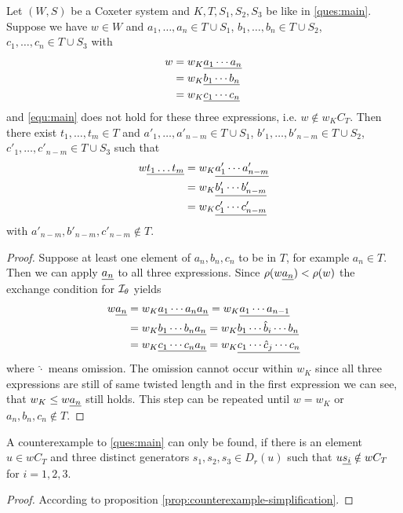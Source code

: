 \begin{prop}
\label{prop:counterexample-simplification}
Let $(W,S)$ be a Coxeter system and $K,T,S_1,S_2,S_3$ be like in \ref{ques:main}.
Suppose we have $w \in W$ and $a_1,\ldots,a_n \in T \cup S_1$, $b_1,\ldots,b_n \in T \cup S_2$, 
$c_1,\ldots,c_n \in T \cup S_3$ with
\begin{align*}
w & = w_K \underline{ a_1 \cdots a_n } \\
  & = w_K \underline{ b_1 \cdots b_n } \\
  & = w_K \underline{ c_1 \cdots c_n }
\end{align*}
and \eqref{equ:main} does not hold for these three expressions, i.e. $w
\notin w_K C_T$.
Then there exist $t_1,\ldots,t_m \in T$ and $a'_1,\ldots,a'_{n-m} \in T \cup S_1$,
$b'_1,\ldots,b'_{n-m} \in T \cup S_2$, $c'_1,\ldots,c'_{n-m} \in T \cup S_3$ such that
\begin{align*}
w \underline{t_1 \ldots t_m} & = w_K \underline{ a'_1 \cdots a'_{n-m} } \\
                       & = w_K \underline{ b'_1 \cdots b'_{n-m} } \\
                       & = w_K \underline{ c'_1 \cdots c'_{n-m} }
\end{align*}
with $a'_{n-m},b'_{n-m},c'_{n-m} \notin T$.

\begin{proof}
Suppose at least one element of $a_n,b_n,c_n$ to be in $T$, for example $a_n \in T$.
Then we can apply $\underline{a_n}$ to all three expressions. Since $\rho (w \underline{a_n}) < \rho(w)$
the exchange condition for $\mathcal{I}_{\theta}$ \cite[Proposition 3.10]{hultman:comb-twisted-invo}
yields
\begin{align*}
w \underline{a_n} & = w_K \underline{ a_1 \cdots a_n a_n } = w_K \underline{ a_1 \cdots a_{n-1} } \\
           & = w_K \underline{ b_1 \cdots b_n a_n } = w_K \underline{ b_1 \cdots \hat b_i \cdots b_n } \\
           & = w_K \underline{ c_1 \cdots c_n a_n } = w_K \underline{ c_1 \cdots \hat c_j \cdots c_n }
\end{align*}
where $\hat \cdot$ means omission. The omission cannot occur within $w_K$ since all three
expressions are still of same twisted length and in the first expression we can see, that
$w_K \leq w \underline{a_n}$ still holds. This step can be repeated until $w = w_K$ or
$a_n,b_n,c_n \notin T$.
\end{proof}
\end{prop}

\begin{lemm}
A counterexample to \ref{ques:main} can only be found, if there is an element $u \in w C_T$
and three distinct generators $s_1,s_2,s_3 \in D_r(u)$ such that $u \underline{s_i} \notin w C_T$
for $i=1,2,3$.

\begin{proof}
According to proposition \ref{prop:counterexample-simplification}.
\end{proof}
\end{lemm}